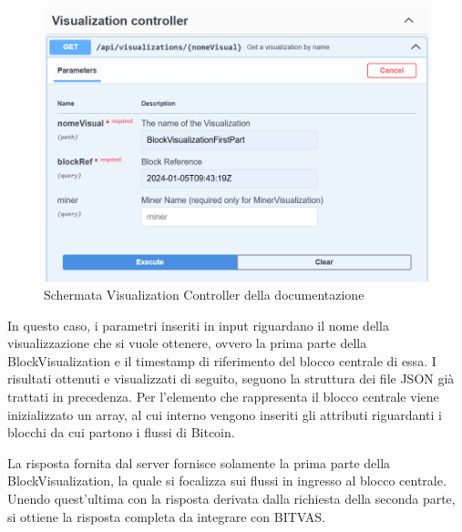 \begin{figure}[H]
    \centering \includegraphics[keepaspectratio=true,scale=0.5]{Images/VisControllerSwaggerTest.png}
    \caption{Schermata Visualization Controller della documentazione}
\end{figure}
In questo caso, i parametri inseriti in input riguardano il nome della visualizzazione che si vuole ottenere, ovvero la prima parte della BlockVisualization e il timestamp di riferimento del blocco centrale di essa.
I risultati ottenuti e visualizzati di seguito, seguono la struttura dei file JSON già trattati in precedenza.
Per l'elemento che rappresenta il blocco centrale viene inizializzato un array, al cui interno vengono inseriti gli attributi riguardanti i blocchi da cui partono i flussi di Bitcoin.

La risposta fornita dal server fornisce solamente la prima parte della BlockVisualization, la quale si focalizza sui flussi in ingresso al blocco centrale.
Unendo quest'ultima con la risposta derivata dalla richiesta della seconda parte, si ottiene la risposta completa da integrare con BITVAS.

